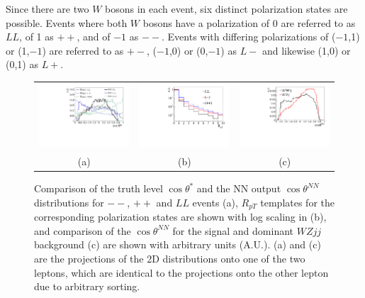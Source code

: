 \documentclass[aps,prl,twocolumn,showpacs,superscriptaddress,groupeaddress,floatfix]{revtex4}
\def\ts{\ensuremath{ \theta^{*} }\xspace}
\def\tsNN{\ensuremath{ \theta^{NN} }\xspace}
\def\cts{\ensuremath{ \cos\ts }\xspace}
\def\ctsNN{\ensuremath{ \cos\tsNN }\xspace}
\begin{document}
Since there are two $W$ bosons in each event, six distinct polarization states are possible. Events where both $W$ bosons have a polarization of 0 are referred to as $LL$, of 1 as $++$, and of $-1$ as $--$. Events with differing polarizations of ($-1$,1) or (1,$-1$) are referred to as $+-$, ($-1$,0) or (0,$-1$) as $L-$ and likewise (1,0) or (0,1) as $L+$. 

\begin{figure}
\begin{tabular}{ccc}
\includegraphics[width=.32\textwidth,height=.18\textheight]{fig_01a.pdf}&
\includegraphics[width=.32\textwidth,height=.18\textheight]{fig_01b.pdf}&
\includegraphics[width=.32\textwidth,height=.18\textheight]{fig_01c.pdf}\\
(a)&(b)&(c)\\
\end{tabular}
\caption{\label{fig:polarization_comparison} Comparison of the truth level \cts and the 
NN output \ctsNN distributions for $--$, $++$ and $LL$ events (a),
$R_{pT}$ templates for the corresponding polarization states are shown
with log scaling in (b), and comparison of the \ctsNN for the signal
and dominant $WZjj$ background (c) are shown with arbitrary units
(A.U.). (a) and (c) are the projections of the 2D distributions onto
one of the two leptons, which are identical to the projections onto the
other lepton due to arbitrary sorting.}
\end{figure}
\end{document}
